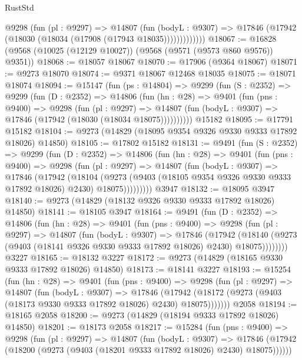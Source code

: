 \begin{lexlean}{RustStd}
\begin{coremodule}
              @9298
                (fun (pl : @9297) =>
                @14807
                  (fun (bodyL : @9307) =>
                  @17846 (@17942 (@18030 (@18034 (@17908 (@17943 @18035)))))))))))))
@18067 := @16828 (@9568 (@10025 (@12129 @10027)) (@9568 (@9571 (@9573 @860 @9576)) @9351))
@18068 := @18057 @18067
@18070 := @17906 (@9364 @18067)
@18071 := @9273 @18070
@18074 := @9371 @18067 @12468 @18035
@18075 := @18071 @18074
@18094 := @15147
    (fun (ps : @14804) =>
    @9299
      (fun (S : @2352) =>
      @9299
        (fun (D : @2352) =>
        @14806
          (fun (hn : @28) =>
          @9401
            (fun (pns : @9400) =>
            @9298
              (fun (pl : @9297) =>
              @14807 (fun (bodyL : @9307) => @17846 (@17942 (@18030 (@18034 @18075))))))))))
    @15182
@18095 := @17791 @15182
@18104 := @9273 (@14829 (@18095 @9354 @9326 @9330 @9333 @17892 @18026) @14850)
@18105 := @17802 @15182
@18131 := @9491
    (fun (S : @2352) =>
    @9299
      (fun (D : @2352) =>
      @14806
        (fun (hn : @28) =>
        @9401
          (fun (pns : @9400) =>
          @9298
            (fun (pl : @9297) =>
            @14807
              (fun (bodyL : @9307) =>
              @17846
                (@17942
                  (@18104
                    (@9273
                      (@9403 (@18105 @9354 @9326 @9330 @9333 @17892 @18026) @2430)
                      @18075)))))))))
    @3947
@18132 := @18095 @3947
@18140 := @9273 (@14829 (@18132 @9326 @9330 @9333 @17892 @18026) @14850)
@18141 := @18105 @3947
@18164 := @9491
    (fun (D : @2352) =>
    @14806
      (fun (hn : @28) =>
      @9401
        (fun (pns : @9400) =>
        @9298
          (fun (pl : @9297) =>
          @14807
            (fun (bodyL : @9307) =>
            @17846
              (@17942
                (@18140 (@9273 (@9403 (@18141 @9326 @9330 @9333 @17892 @18026) @2430) @18075))))))))
    @3227
@18165 := @18132 @3227
@18172 := @9273 (@14829 (@18165 @9330 @9333 @17892 @18026) @14850)
@18173 := @18141 @3227
@18193 := @15254
    (fun (hn : @28) =>
    @9401
      (fun (pns : @9400) =>
      @9298
        (fun (pl : @9297) =>
        @14807
          (fun (bodyL : @9307) =>
          @17846
            (@17942 (@18172 (@9273 (@9403 (@18173 @9330 @9333 @17892 @18026) @2430) @18075)))))))
    @2058
@18194 := @18165 @2058
@18200 := @9273 (@14829 (@18194 @9333 @17892 @18026) @14850)
@18201 := @18173 @2058
@18217 := @15284
    (fun (pns : @9400) =>
    @9298
      (fun (pl : @9297) =>
      @14807
        (fun (bodyL : @9307) =>
        @17846 (@17942 (@18200 (@9273 (@9403 (@18201 @9333 @17892 @18026) @2430) @18075))))))

\end{coremodule}
\end{lexlean}
